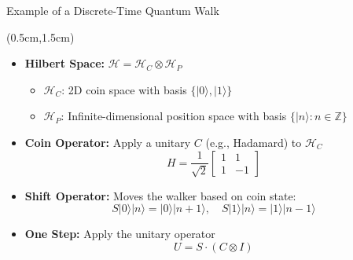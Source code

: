 \documentclass{beamer}
\theoremstyle{definition}
\begin{document}
\begin{frame}{Example of a Discrete-Time Quantum Walk}
    
    \begin{textblock*}{12cm}(0.5cm,1.5cm)
        \begin{itemize}
            \item \textbf{Hilbert Space:} $\mathcal{H} = \mathcal{H}_C \otimes \mathcal{H}_P$
            \begin{itemize}
                \item $\mathcal{H}_C$: 2D coin space with basis $\{|0\rangle, |1\rangle\}$
                \item $\mathcal{H}_P$: Infinite-dimensional position space with basis $\{|n\rangle : n \in \mathbb{Z}\}$
            \end{itemize}
        
            \item \textbf{Coin Operator:} Apply a unitary $C$ (e.g., Hadamard) to $\mathcal{H}_C$
            \[
            H = \frac{1}{\sqrt{2}} \begin{bmatrix}
                1 & 1 \\
                1 & -1
            \end{bmatrix}
            \]
        
            \item \textbf{Shift Operator:} Moves the walker based on coin state:
            \[
            S|0\rangle|n\rangle = |0\rangle|n + 1\rangle, \quad
            S|1\rangle|n\rangle = |1\rangle|n - 1\rangle
            \]
        
            \item \textbf{One Step:} Apply the unitary operator
            \[
            U = S \cdot (C \otimes I)
            \]
        \end{itemize}


                   
    \end{textblock*}
\end{frame}
\end{document}
